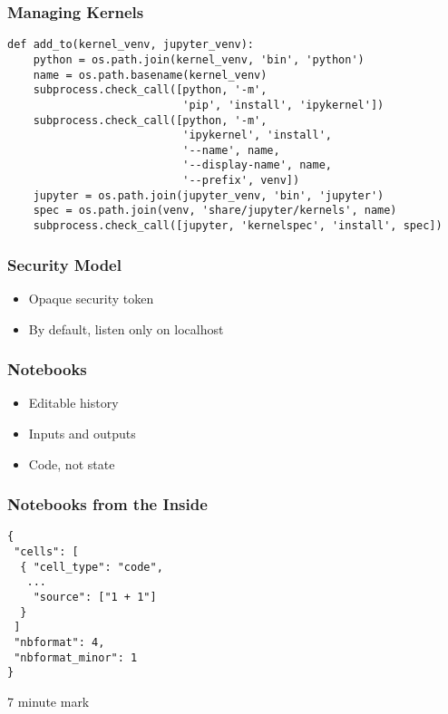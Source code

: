 \begin{frame}[fragile]
\frametitle{Managing Kernels}

\begin{lstlisting}
def add_to(kernel_venv, jupyter_venv):
    python = os.path.join(kernel_venv, 'bin', 'python')
    name = os.path.basename(kernel_venv)
    subprocess.check_call([python, '-m',
                           'pip', 'install', 'ipykernel'])
    subprocess.check_call([python, '-m',
                           'ipykernel', 'install',
                           '--name', name,
                           '--display-name', name,
                           '--prefix', venv])
    jupyter = os.path.join(jupyter_venv, 'bin', 'jupyter')
    spec = os.path.join(venv, 'share/jupyter/kernels', name)
    subprocess.check_call([jupyter, 'kernelspec', 'install', spec])
\end{lstlisting}
\end{frame}

\begin{frame}
\frametitle{Security Model}

\begin{itemize}
\item Opaque security token
\item By default, listen only on localhost
\end{itemize}

\end{frame}

\begin{frame}
\frametitle{Notebooks}

\begin{itemize}
\item Editable history
\item Inputs and outputs
\item Code, not state
\end{itemize}

\end{frame}

\begin{frame}[fragile]
\frametitle{Notebooks from the Inside}

\begin{lstlisting}
{
 "cells": [
  { "cell_type": "code",
   ...
    "source": ["1 + 1"]
  }
 ]
 "nbformat": 4,
 "nbformat_minor": 1
}
\end{lstlisting}

\end{frame}

7 minute mark

